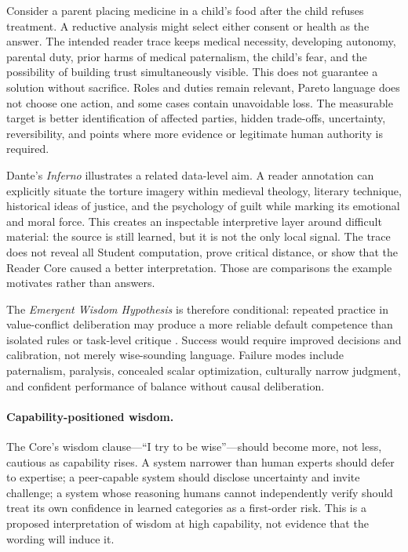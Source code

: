 \documentclass[11pt]{article}
\begin{document}
Consider a parent placing medicine in a child's food after the child refuses treatment. A reductive analysis might select either consent or health as the answer. The intended reader trace keeps medical necessity, developing autonomy, parental duty, prior harms of medical paternalism, the child's fear, and the possibility of building trust simultaneously visible. This does not guarantee a solution without sacrifice. Roles and duties remain relevant, Pareto language does not choose one action, and some cases contain unavoidable loss. The measurable target is better identification of affected parties, hidden trade-offs, uncertainty, reversibility, and points where more evidence or legitimate human authority is required.

Dante's \emph{Inferno} illustrates a related data-level aim. A reader annotation can explicitly situate the torture imagery within medieval theology, literary technique, historical ideas of justice, and the psychology of guilt while marking its emotional and moral force. This creates an inspectable interpretive layer around difficult material: the source is still learned, but it is not the only local signal. The trace does not reveal all Student computation, prove critical distance, or show that the Reader Core caused a better interpretation. Those are comparisons the example motivates rather than answers.

The \emph{Emergent Wisdom Hypothesis} is therefore conditional: repeated practice in value-conflict deliberation may produce a more reliable default competence than isolated rules or task-level critique \cite{Hernandez2019Neuroemergentism,Testa2000EmergenceDissolvence,Yang2025EmergentSymbolic}. Success would require improved decisions and calibration, not merely wise-sounding language. Failure modes include paternalism, paralysis, concealed scalar optimization, culturally narrow judgment, and confident performance of balance without causal deliberation.

\paragraph{Capability-positioned wisdom.} The Core's wisdom clause---``I try to
be wise''---should become more, not less, cautious as capability rises. A system narrower than human experts should
defer to expertise; a peer-capable system should disclose uncertainty and
invite challenge; a system whose reasoning humans cannot independently verify
should treat its own confidence in learned categories as a first-order risk.
This is a proposed interpretation of wisdom at high capability, not evidence
that the wording will induce it.
	
\end{document}
